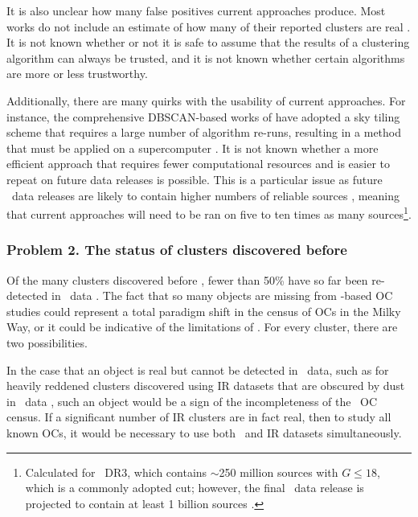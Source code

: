 It is also unclear how many false positives current approaches produce. Most works do not include an estimate of how many of their reported clusters are real \citep[e.g.][]{castro-ginard_new_2018,liu_catalog_2019,he_catalogue_2021}. It is not known whether or not it is safe to assume that the results of a clustering algorithm can always be trusted, and it is not known whether certain algorithms are more or less trustworthy.

Additionally, there are many quirks with the usability of current approaches. For instance, the comprehensive DBSCAN-based works of \cite{castro-ginard_new_2018,castro-ginard_hunting_2019,castro-ginard_hunting_2020,castro-ginard_hunting_2022} have adopted a sky tiling scheme that requires a large number of algorithm re-runs, resulting in a method that must be applied on a supercomputer \citep{castro-ginard_hunting_2022}. It is not known whether a more efficient approach that requires fewer computational resources and is easier to repeat on future data releases is possible. This is a particular issue as future \gaia\ data releases are likely to contain higher numbers of reliable sources \citep{gaia_collaboration_gaia_2022}, meaning that current approaches will need to be ran on five to ten times as many sources\footnote{Calculated for \gaia\ DR3, which contains $\sim$250 million sources with $G\leq18$, which is a commonly adopted cut; however, the final \gaia\ data release is projected to contain at least 1 billion sources \citep{gaia_collaboration_gaia_2016}.}.


\subsubsection{Problem 2. The status of clusters discovered before \gaia}
\label{sec:intro:aims:issues:pre_gaia}

Of the many clusters discovered before \gaia, fewer than 50\% have so far been re-detected in \gaia\ data \citep{cantat-gaudin_gaia_2018,cantat-gaudin_clusters_2020}. The fact that so many objects are missing from \gaia-based OC studies could represent a total paradigm shift in the census of OCs in the Milky Way, or it could be indicative of the limitations of \gaia. For every cluster, there are two possibilities.

In the case that an object is real but cannot be detected in \gaia\ data, such as for heavily reddened clusters discovered using IR datasets that are obscured by dust in \gaia\ data \citep{cantat-gaudin_clusters_2020}, such an object would be a sign of the incompleteness of the \gaia\ OC census. If a significant number of IR clusters are in fact real, then to study all known OCs, it would be necessary to use both \gaia\ and IR datasets simultaneously.

